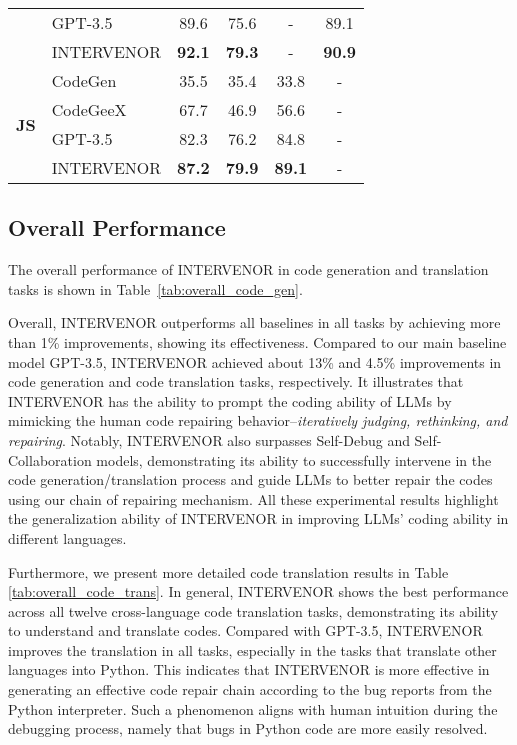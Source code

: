 \documentclass[11pt]{article}
\begin{document}
\begin{table}[t]
{\begin{tabular}{l|l|cccc}
                                     & GPT-3.5               & 89.6            & 75.6          & -             & 89.1                \\
                                     & INTERVENOR                            & \textbf{92.1}            & \textbf{79.3} & -             & \textbf{90.9}       \\ \hline
\multirow{4}{*}{\textbf{JS}} & CodeGen               & 35.5            & 35.4          & 33.8           & -                   \\
                                     & CodeGeeX                 & 67.7   & 46.9          & 56.6          & -                   \\
                                     & GPT-3.5               & 82.3            & 76.2          & 84.8          & -                   \\
                                     & INTERVENOR                            & \textbf{87.2}            & \textbf{79.9} & \textbf{89.1} & -                   \\ \hline
\end{tabular}}
\end{table} 
\subsection{Overall Performance}
The overall performance of INTERVENOR in code generation and translation tasks is shown in Table~\ref{tab:overall_code_gen}. 

Overall, INTERVENOR outperforms all baselines in all tasks by achieving more than 1\% improvements, showing its effectiveness. Compared to our main baseline model GPT-3.5, INTERVENOR achieved about 13\% and  4.5\% improvements in code generation and code translation tasks, respectively. It illustrates that INTERVENOR has the ability to prompt the coding ability of LLMs by mimicking the human code repairing behavior--\textit{iteratively judging, rethinking, and repairing}. Notably, INTERVENOR also surpasses Self-Debug and Self-Collaboration models, demonstrating its ability to successfully intervene in the code generation/translation process and guide LLMs to better repair the codes using our chain of repairing mechanism. All these experimental results highlight the generalization ability of INTERVENOR in improving LLMs' coding ability in different languages. 


Furthermore, we present more detailed code translation results in Table \ref{tab:overall_code_trans}. In general, INTERVENOR shows the best performance across all twelve cross-language code translation tasks, demonstrating its ability to understand and translate codes. Compared with GPT-3.5, INTERVENOR improves the translation in all tasks, especially in the tasks that translate other languages into Python. This indicates that INTERVENOR is more effective in generating an effective code repair chain according to the bug reports from the Python interpreter. Such a phenomenon aligns with human intuition during the debugging process, namely that bugs in Python code are more easily resolved.
\end{document}
